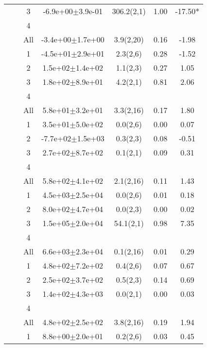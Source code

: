 \begin{longtable}{llccccS[table-format=-2.2, table-space-text-post = {***}]}
   &  & 3 & -6.9e+00$\pm$3.9e-01 & 306.2(2,1) & 1.00 & -17.50* \\ 
   &  & 4 &  &  &  &  \\ 
   &  & All & -3.4e+00$\pm$1.7e+00 & 3.9(2,20) & 0.16 & -1.98 \\ 
   \midrule
{} & {} & 1 & -4.5e+01$\pm$2.9e+01 & 2.3(2,6) & 0.28 & -1.52 \\ 
   &  & 2 &  1.5e+02$\pm$1.4e+02 & 1.1(2,3) & 0.27 & 1.05 \\ 
   &  & 3 &  1.8e+02$\pm$8.9e+01 & 4.2(2,1) & 0.81 & 2.06 \\ 
   &  & 4 &  &  &  &  \\ 
   &  & All &  5.8e+01$\pm$3.2e+01 & 3.3(2,16) & 0.17 & 1.80 \\ 
   \midrule
{} & {} & 1 &  3.5e+01$\pm$5.0e+02 & 0.0(2,6) & 0.00 & 0.07 \\ 
   &  & 2 & -7.7e+02$\pm$1.5e+03 & 0.3(2,3) & 0.08 & -0.51 \\ 
   &  & 3 &  2.7e+02$\pm$8.7e+02 & 0.1(2,1) & 0.09 & 0.31 \\ 
   &  & 4 &  &  &  &  \\ 
   &  & All &  5.8e+02$\pm$4.1e+02 & 2.1(2,16) & 0.11 & 1.43 \\ 
   \midrule
{} & {} & 1 &  4.5e+03$\pm$2.5e+04 & 0.0(2,6) & 0.01 & 0.18 \\ 
   &  & 2 &  8.0e+02$\pm$4.7e+04 & 0.0(2,3) & 0.00 & 0.02 \\ 
   &  & 3 &  1.5e+05$\pm$2.0e+04 & 54.1(2,1) & 0.98 & 7.35 \\ 
   &  & 4 &  &  &  &  \\ 
   &  & All &  6.6e+03$\pm$2.3e+04 & 0.1(2,16) & 0.01 & 0.29 \\ 
   \midrule
{} & {} & 1 &  4.8e+02$\pm$7.2e+02 & 0.4(2,6) & 0.07 & 0.67 \\ 
   &  & 2 &  2.5e+02$\pm$3.7e+02 & 0.5(2,3) & 0.14 & 0.69 \\ 
   &  & 3 &  1.4e+02$\pm$4.3e+03 & 0.0(2,1) & 0.00 & 0.03 \\ 
   &  & 4 &  &  &  &  \\ 
   &  & All &  4.8e+02$\pm$2.5e+02 & 3.8(2,16) & 0.19 & 1.94 \\ 
   \midrule
{} & {} & 1 &  8.8e+00$\pm$2.0e+01 & 0.2(2,6) & 0.03 & 0.45 \\ 

\end{longtable}
